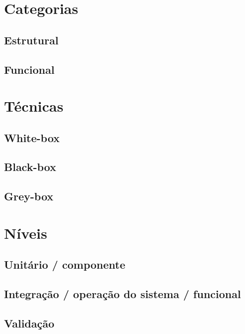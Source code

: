 \documentclass[
	12pt,				%
	openright,			%
	twoside,			%
	a4paper,			%
	english,			%
	brazil,				%
	]{abntex2}
\begin{document}
\section{Categorias}


\subsection{Estrutural}


\subsection{Funcional}

\section{Técnicas}


\subsection{White-box}


\subsection{Black-box}


\subsection{Grey-box}

\section{Níveis}


\subsection{Unitário / componente}


\subsection{Integração / operação do sistema / funcional}


\subsection{Validação}
\end{document}
